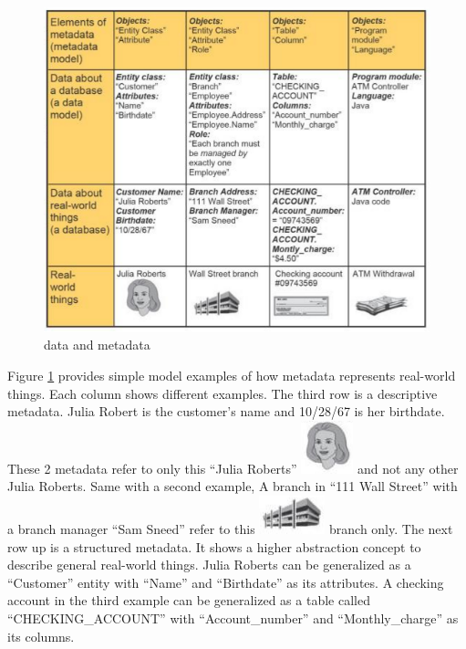 \begin{figure}[h]
	\centering
	\includegraphics[scale=0.8]{res/bg-knowledge/data-and-metadata}
	\caption{data and metadata }
	\label{fig:data-metadata}
\end{figure}
Figure \ref{fig:data-metadata} provides simple model examples of how metadata represents real-world things.
Each column shows different examples.
The third row is a descriptive metadata.
Julia Robert is the customer's name and 10/28/67 is her birthdate.
These 2 metadata refer to only this \enquote{Julia Roberts} \includegraphics[scale=0.3]{res/bg-knowledge/metadata-julia} and not any other Julia Roberts. 
Same with a second example, A branch in \enquote{111 Wall Street} with a branch manager \enquote{Sam Sneed} refer to this \includegraphics[scale=0.3]{res/bg-knowledge/metadata-wallstreet} branch only.
The next row up is a structured metadata.
It shows a higher abstraction concept to describe general real-world things.
Julia Roberts can be generalized as a \enquote{Customer} entity with \enquote{Name} and \enquote{Birthdate} as its attributes.
A checking account in the third example can be generalized as a table called \enquote{CHECKING\_ACCOUNT} with \enquote{Account\_number} and \enquote{Monthly\_charge} as its columns.


